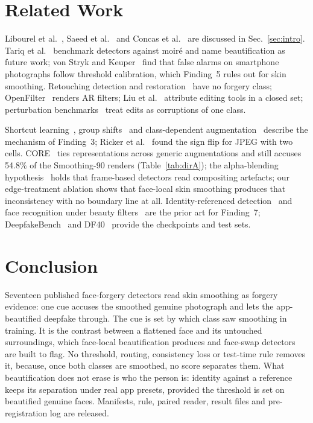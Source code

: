 \documentclass[conference]{IEEEtran}
\begin{document}
\section{Related Work}
\label{sec:related}
Libourel et al.~\cite{libourel2024}, Saeed et al.~\cite{saeed2025} and Concas et al.~\cite{concas2025} are discussed in
Sec.~\ref{sec:intro}. Tariq et al.~\cite{moire2025} benchmark detectors against moir\'e and name beautification as future work; von Stryk and
Keuper~\cite{laionmobile2026} find that false alarms on smartphone photographs follow threshold calibration, which Finding~5
rules out for skin smoothing. Retouching detection and
restoration~\cite{bharati2016,jain2018,wang2019photoshop,retouchingffhq,frrffusion,mofrr,reface} have no forgery class;
OpenFilter~\cite{openfilter2022} renders AR filters; Liu et al.~\cite{miea2026} attribute editing tools in a closed set;
perturbation benchmarks~\cite{deeperforensics2020,hendrycks2019} treat edits as corruptions of one class.

Shortcut learning~\cite{geirhos2020}, group shifts~\cite{sagawa2020} and class-dependent augmentation~\cite{balestriero2022} describe
the mechanism of Finding~3; Ricker et al.~\cite{ricker2026biasid} found the sign flip for JPEG with two cells. CORE~\cite{core} ties representations across generic augmentations and still accuses 54.8\% of the Smoothing-90 renders (Table~\ref{tab:dirA}); the alpha-blending hypothesis~\cite{alphablend2026} holds that frame-based detectors read compositing artefacts; our
edge-treatment ablation shows that face-local skin smoothing produces that inconsistency with no boundary line at all. Identity-referenced detection~\cite{identitydriven2020,idreveal2021,ict2022,yin2026,vipguard2025} and face recognition under beauty filters~\cite{mirabet2025} are the prior art for Finding~7; DeepfakeBench~\cite{deepfakebench} and
DF40~\cite{df40} provide the checkpoints and test sets.

\section{Conclusion}
Seventeen published face-forgery detectors read skin smoothing as forgery evidence: one cue accuses the smoothed genuine
photograph and lets the app-beautified deepfake through. The cue is set by which class saw smoothing in training. It is the
contrast between a flattened face and its untouched surroundings, which face-local beautification produces and face-swap
detectors are built to flag. No threshold, routing, consistency loss or test-time rule removes it, because, once both
classes are smoothed, no score separates them.
What beautification does not erase is who the person is: identity against a reference keeps its separation under real app
presets, provided the threshold is set on beautified genuine faces. Manifests, rule, paired reader, result files and pre-registration log are released.



\end{document}
